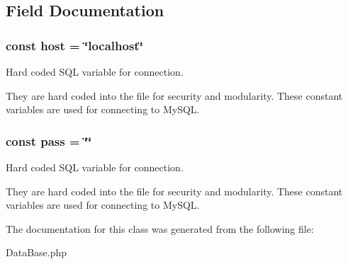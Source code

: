 \subsection{Field Documentation}
\hypertarget{class_data_base_a657433cc10254cb11103d5ca366a5a6d}{
\subsubsection[{host}]{\setlength{\rightskip}{0pt plus 5cm}const host = \char`\"{}localhost\char`\"{}}}\label{class_data_base_a657433cc10254cb11103d5ca366a5a6d}


Hard coded S\-Q\-L variable for connection. 

They are hard coded into the file for security and modularity. These constant variables are used for connecting to My\-S\-Q\-L. \hypertarget{class_data_base_afea42faad022b77d80bc1c081dad5815}{
\subsubsection[{pass}]{\setlength{\rightskip}{0pt plus 5cm}const pass = \char`\"{}\char`\"{}}}\label{class_data_base_afea42faad022b77d80bc1c081dad5815}


Hard coded S\-Q\-L variable for connection. 

They are hard coded into the file for security and modularity. These constant variables are used for connecting to My\-S\-Q\-L. 

The documentation for this class was generated from the following file\-:\begin{DoxyCompactItemize}
\item 
Data\-Base.\-php\end{DoxyCompactItemize}
